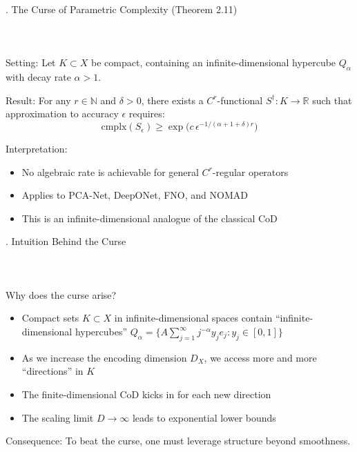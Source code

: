 \documentclass{beamer}
\def\b{\color{blue}}
\def\r{\color{red}}
\begin{document}
\begin{frame}{\thesection. The Curse of Parametric Complexity (Theorem 2.11)}
\framesubtitle{$\quad$}
{\Large {\b Setting}: Let $ K \subset X $ be compact, containing an infinite-dimensional hypercube $ Q_\alpha $ with decay rate $ \alpha > 1 $.}
\medskip

{\Large {\b Result}: For any $ r \in \mathbb{N} $ and $ \delta > 0 $, there exists a $ C^r $-functional $ S^\dagger : K \to \mathbb{R} $ such that approximation to accuracy $ \epsilon $ requires:
$$
\text{cmplx}(S_\epsilon) \ge \exp\!\big(c \, \epsilon^{-1/(\alpha + 1 + \delta)r}\big)
$$
}
\medskip

{\Large {\b Interpretation}: 
\begin{itemize}
    \item No algebraic rate is achievable for general $ C^r $-regular operators
    \item Applies to PCA-Net, DeepONet, FNO, and NOMAD
    \item This is an infinite-dimensional analogue of the classical CoD
\end{itemize}
}

\end{frame}

\begin{frame}{\thesection. Intuition Behind the Curse}
\framesubtitle{$\quad$}
{\Large {\b Why does the curse arise?}}
\medskip

{\Large 
\begin{itemize}
    \item Compact sets $ K \subset X $ in infinite-dimensional spaces contain ``infinite-dimensional hypercubes'' $ Q_\alpha = \big\{ A \sum_{j=1}^\infty j^{-\alpha} y_j e_j : y_j \in [0,1] \big\} $
    \item As we increase the encoding dimension $ D_X $, we access more and more ``directions'' in $ K $
    \item The finite-dimensional CoD kicks in for each new direction
    \item The scaling limit $ D \to \infty $ leads to {\r exponential} lower bounds
\end{itemize}
}
\medskip

{\Large {\b Consequence}: To beat the curse, one must leverage structure {\r beyond} smoothness.}

\end{frame}
\end{document}

